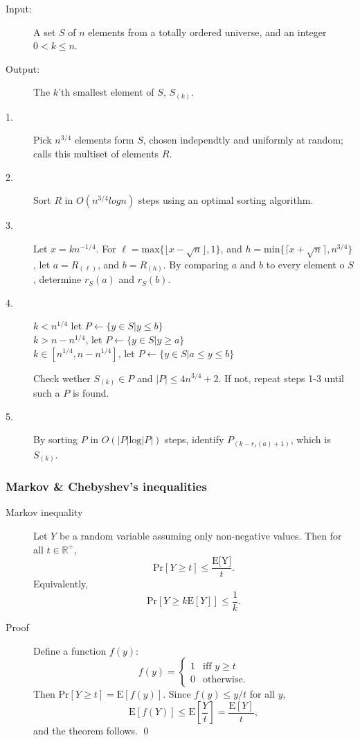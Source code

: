 \begin{description}
\item[Input:] A set $S$ of $n$ elements from a totally ordered universe, and an
  integer $0 < k\leq n$.
\item[Output:] The $k$'th smallest element of $S$, $S_{(k)}$.
\item[1.] Pick $n^{3/4}$ elements form $S$, chosen independtly and uniformly at
  random; calls this multiset of elements $R$.
\item[2.] Sort $R$ in $O(n^{3/4} log n)$ steps using an optimal sorting
  algorithm.
\item[3.] Let $x = kn^{-1/4}$. For $\ell = \text{max}\{\lfloor
  x-\sqrt{n}\rfloor,1\}$, and $h = \text{min}\{\lceil x + \sqrt{n}\rceil
  ,n^{3/4}\}$, let $a = R_{(\ell)}$, and $b = R_{(h)}$. By comparing $a$ and $b$
  to every element o $S$, determine $r_S(a)$ and $r_S(b)$.
\item[4.] \begin{codebox}
\li \If $k < n^{1/4}$ let $P \gets \{y \in S | y \leq b\}$ \\
\li \Else \If $k > n-n^{1/4}$, let $P \gets \{y \in S | y\geq a\}$ \\
\li \Else \If $k \in [n^{1/4}, n-n^{1/4}]$, let $P \gets \{y \in S | a \leq y \leq b\}$ \\
\end{codebox}
Check wether $S_{(k)} \in P$ and $|P| \leq 4n^{3/4}+2$. If not, repeat steps 1-3
until such a $P$ is found.
\item[5.] By sorting $P$ in $O(|P|\text{log}|P|)$ steps, identify
  $P_{(k-r_s(a)+1)}$, which is $S_{(k)}$.
\end{description}


\subsubsection{Markov \& Chebyshev's inequalities}
\begin{description}
\item[Markov inequality] Let $Y$ be a random variable assuming only non-negative
  values. Then for all $t \in \mathbb{R}^+$,
  \[
    \text{Pr}[Y \geq t] \leq \frac{\text{E[Y]}}{t}.
  \]
  Equivalently,
  \[
    \text{Pr}[Y \geq k\text{E}[Y]] \leq \frac{1}{k}.
  \]
\item[Proof] Define a function $f(y)$:
  \[
   f(y) = \begin{cases}
     1 & \text{iff } y \geq t\\
     0 & \text{otherwise.}
   \end{cases}
  \]
  Then $\text{Pr}[Y \geq t] = \text{E}[f(y)]$. Since $f(y) \leq y/t$ for all $y$,
  \[
    \text{E}[f(Y)] \leq \text{E}\left [\frac{Y}{t} \right ] = \frac{\text{E}[Y]}{t},
  \]
  and the theorem follows. \qed
\end{description}

